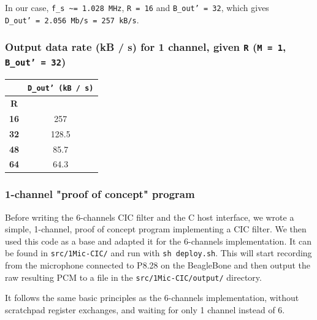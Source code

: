 \documentclass[]{report}
\begin{document}
In our case, \texttt{f\_s\ \textasciitilde{}=\ 1.028\ MHz},
\texttt{R\ =\ 16} and \texttt{B\_out'\ =\ 32}, which
gives \texttt{D\_out'\ =\ 2.056\ Mb/s\ =\ 257\ kB/s}.

\hypertarget{output-data-rate-kb-s-for-1-channel-given-r-m-1-b_out-32}{%
\subsubsection{\texorpdfstring{Output data rate (kB / s) for 1 channel,
given \texttt{R} (\texttt{M\ =\ 1},
\texttt{B\_out'\ =\ 32})}{Output data rate (kB / s) for 1 channel, given R (M = 1, B\_out' = 32)}}\label{output-data-rate-kb-s-for-1-channel-given-r-m-1-b_out-32}}

\begin {table}[H]
\begin{center}
\begin{tabular}{|c|c|}
	\hline  & \textbf{\texttt{D\_out'\ (kB\ /\ s)}} \\ 
	\hline \textbf{R} &  \\ 
	\hline \textbf{16} & 257 \\ 
	\hline \textbf{32} & 128.5 \\ 
	\hline \textbf{48} & 85.7 \\ 
	\hline \textbf{64} & 64.3 \\ 
	\hline 
\end{tabular} 
\end{center}
\end{table}



\hypertarget{channel-proof-of-concept-program}{%
\subsubsection{1-channel "proof of concept"
program}\label{channel-proof-of-concept-program}}

Before writing the 6-channels CIC filter and the C host interface, we wrote a simple, 1-channel, proof of concept program implementing a CIC filter. We then used this code as a base and adapted it for the 6-channels implementation. It can be found in \texttt{src/1Mic-CIC/} and run with \texttt{sh deploy.sh}. This will start recording from the microphone connected to P8.28 on the BeagleBone and then output the raw resulting PCM to a file in the \texttt{src/1Mic-CIC/output/} directory.

It follows the same basic principles as the 6-channels implementation, without scratchpad register exchanges, and waiting for only 1 channel instead of 6.
\end{document}
